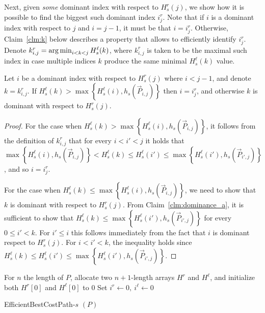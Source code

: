 Next, given \emph{some} dominant index with respect to $H^r_s(j)$, we show how it is possible to find the biggest such dominant index $i^r_j$. Note that if $i$ is a dominant index with respect to $j$ and $i = j-1$, it must be that $i = i^r_j$. Otherwise, Claim~\ref{clm:k} below describes a property that allows to efficiently identify $i^r_j$. Denote $k^r_{i, j} = \operatorname*{arg\,min}_{i < k < j} H^\ell_s(k)$, where $k^r_{i, j}$ is taken to be the maximal such index in case multiple indices $k$ produce the same minimal $H^\ell_s(k)$ value.

\begin{claim}
	\label{clm:k}
	Let $i$ be a dominant index with respect to $H^r_s(j)$ where $i < j-1$, and denote $k = k^r_{i, j}$. 
	If $H^\ell_s(k) > \max\left\{H^\ell_s(i), h_s(\vec{P}_{i, j})\right\}$ then $i = i^r_j$, and otherwise $k$ is dominant with respect to $H^r_s(j)$.
\end{claim}

\begin{proof}
	For the case when $H^\ell_s(k) > \max\left\{H^\ell_s(i), h_s(\vec{P}_{i, j})\right\}$, it follows from the definition of $k^r_{i, j}$ that for every $i < i' < j$ it holds that $\max\left\{H^\ell_s(i), h_s(\vec{P}_{i, j})\right\} < H^\ell_s(k) \leq H^\ell_s(i') \leq \max\left\{H^\ell_s(i'), h_s(\vec{P}_{i', j})\right\}$, and so $i = i^r_j$.
	
	For the case when $H^\ell_s(k) \leq \max\left\{H^\ell_s(i), h_s(\vec{P}_{i, j})\right\}$, we need to show that $k$ is dominant with respect to $H^r_s(j)$. From Claim~\ref{clm:dominance_a}, it is sufficient to show that $H^\ell_s(k) \leq \max\left\{H^\ell_s(i'), h_s(\vec{P}_{i', j})\right\}$ for every $0 \leq i' < k$. For $i' \leq i$ this follows immediately from the fact that $i$ is dominant respect to $H^r_s(j)$. For $i < i' < k$, the inequality holds since $H^\ell_s(k) \leq H^\ell_s(i') \leq \max\left\{H^\ell_s(i'), h_s(\vec{P}_{i', j})\right\}$.
\end{proof}


\begin{algorithm}
	For $n$ the length of $P$, allocate two $n+1$-length arrays $H^r$ and $H^\ell$, and initialize both $H^r[0]$ and $H^{\ell}[0]$ to $0$\;
	Set $i^r \gets 0, \ i^\ell \gets 0$\;
	\;
	\caption{EfficientBestCostPath-$s$ $(P)$}
	\label{algo:effH}
\end{algorithm}

